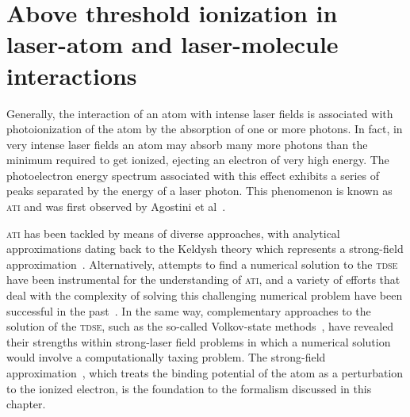 \chapter{Above threshold ionization in laser-atom and laser-molecule interactions}
\label{cha:ati}


Generally, the interaction of an atom with intense laser fields is
associated with photoionization of the atom by the absorption of one
or more photons. In fact, in very intense laser fields an atom may
absorb many more photons than the minimum required to get ionized,
ejecting an electron of very high energy. The photoelectron energy
spectrum associated with this effect exhibits a series of peaks
separated by the energy of a laser photon. This phenomenon is known as
\textsc{ati} and was first observed by Agostini et al~\cite{ATI1979}.

\textsc{ati} has been tackled by means of diverse approaches, with
analytical approximations dating back to the Keldysh theory which
represents a strong-field
approximation~\cite{KeldyshSFA}. Alternatively, attempts to find a
numerical solution to the \textsc{tdse}~\cite{muller_tdse1999,
  scrinzi_tdse1999, Joachain2000} have been instrumental for the
understanding of \textsc{ati}, and a variety of efforts that deal with
the complexity of solving this challenging numerical problem have been
successful in the past~\cite{Becker_ati2002}. In the same way,
complementary approaches to the solution of the \textsc{tdse}, such as
the so-called Volkov-state methods~\cite{Faisal_1973, Reiss_1980,
  Kaminski_1997}, have revealed their strengths within strong-laser
field problems in which a numerical solution would involve a
computationally taxing problem. The strong-field
approximation~\cite{KeldyshSFA}, which treats the binding potential of
the atom as a perturbation to the ionized electron, is the foundation
to the formalism discussed in this chapter.

